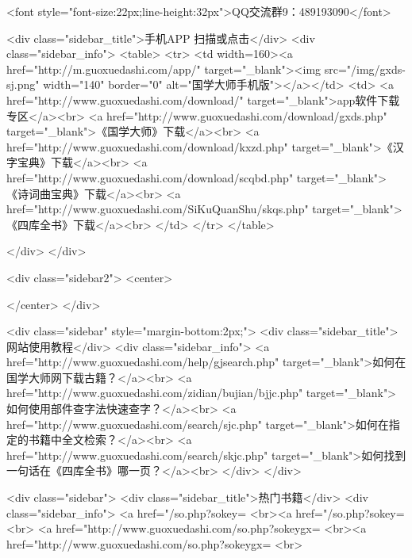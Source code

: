 <font style="font-size:22px;line-height:32px">QQ交流群9：489193090</font>


<div class="sidebar_title">手机APP 扫描或点击</div>
<div class="sidebar_info">
<table>
<tr>
	<td width=160><a href="http://m.guoxuedashi.com/app/" target="_blank"><img src="/img/gxds-sj.png" width="140"  border="0" alt="国学大师手机版"></a></td>
	<td>
<a href="http://www.guoxuedashi.com/download/" target="_blank">app软件下载专区</a><br>
<a href="http://www.guoxuedashi.com/download/gxds.php" target="_blank">《国学大师》下载</a><br>
<a href="http://www.guoxuedashi.com/download/kxzd.php" target="_blank">《汉字宝典》下载</a><br>
<a href="http://www.guoxuedashi.com/download/scqbd.php" target="_blank">《诗词曲宝典》下载</a><br>
<a href="http://www.guoxuedashi.com/SiKuQuanShu/skqs.php" target="_blank">《四库全书》下载</a><br>
</td>
</tr>
</table>

</div>
</div>


<div class="sidebar2">
<center>


</center>
</div>

<div class="sidebar"  style="margin-bottom:2px;">
<div class="sidebar_title">网站使用教程</div>
<div class="sidebar_info">
<a href="http://www.guoxuedashi.com/help/gjsearch.php" target="_blank">如何在国学大师网下载古籍？</a><br>
<a href="http://www.guoxuedashi.com/zidian/bujian/bjjc.php" target="_blank">如何使用部件查字法快速查字？</a><br>
<a href="http://www.guoxuedashi.com/search/sjc.php" target="_blank">如何在指定的书籍中全文检索？</a><br>
<a href="http://www.guoxuedashi.com/search/skjc.php" target="_blank">如何找到一句话在《四库全书》哪一页？</a><br>
</div>
</div>


<div class="sidebar">
<div class="sidebar_title">热门书籍</div>
<div class="sidebar_info">
<a href="/so.php?sokey=%
<br><a href="/so.php?sokey=%
<br>
<a href="http://www.guoxuedashi.com/so.php?sokeygx=%
<br><a href="http://www.guoxuedashi.com/so.php?sokeygx=%
<br>

